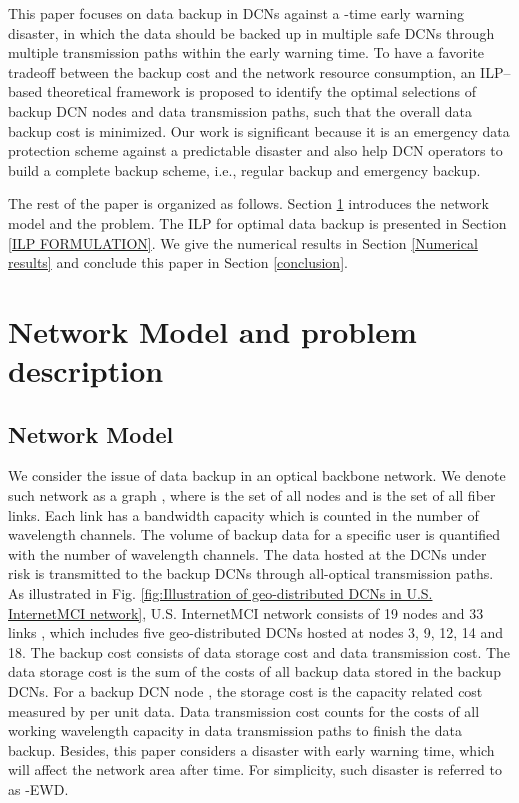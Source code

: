 \documentclass[conference]{IEEEtran}\IEEEoverridecommandlockouts
\begin{document}
This paper focuses  on  data backup in DCNs against a -time early warning disaster, in which the data should be backed up in multiple safe DCNs through multiple transmission paths  within the early warning time. To have a favorite tradeoff between the backup cost and the network resource consumption, an ILP--based theoretical framework is proposed to identify the optimal selections of backup DCN nodes and data transmission paths, such that the overall data backup cost is minimized. Our work is significant because it is an emergency data protection scheme against a predictable disaster and also help DCN operators to build a complete backup scheme, i.e., regular backup and emergency backup.



The rest of the paper is organized as follows. Section \ref{System Model and problem description} introduces the network model and the problem. The ILP for optimal data backup is presented in Section \ref{ILP FORMULATION}. We give the numerical results in Section \ref{Numerical results} and conclude this paper in Section \ref{conclusion}.

\section{Network Model and problem description}\label{System Model and problem description}
\subsection{Network Model }\label{System Model}
 We consider the issue of data backup in an optical backbone network. We denote such network as a graph , where  is the set of all nodes and  is the set of all fiber links.
Each link has a bandwidth capacity which is counted in the number of wavelength channels.
The volume of backup data for a specific user is quantified with the number of wavelength channels.
The data hosted at the DCNs  under risk is transmitted to  the backup DCNs  through all-optical transmission paths.
As illustrated in Fig. \ref{fig:Illustration of geo-distributed DCNs in U.S. InternetMCI network},  U.S. InternetMCI network  consists of 19 nodes and 33 links \cite{InternetMCI}, which includes five geo-distributed DCNs hosted at nodes 3, 9, 12, 14 and 18.
The backup cost consists of data storage cost and data transmission cost. The data storage cost is the sum of the costs of all backup data stored in the backup DCNs. For a backup DCN node , the storage cost is the capacity related cost measured by  per unit data. Data transmission cost counts for the costs of all working wavelength capacity in data transmission paths to finish the data backup. Besides, this paper considers a disaster with   early warning time, which will affect the network area after  time. For simplicity, such disaster is referred to as  -EWD.
\end{document}
